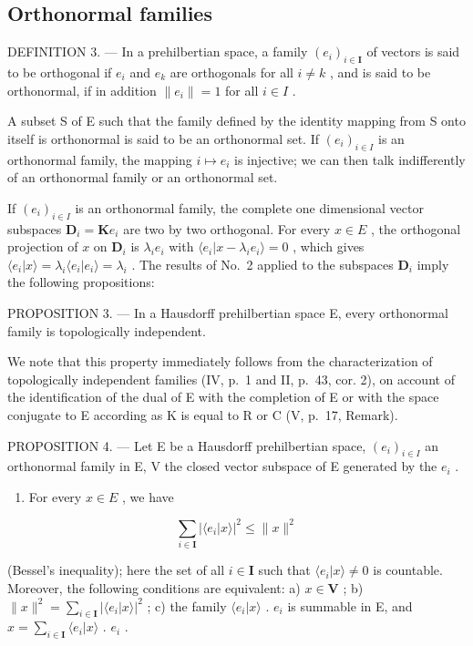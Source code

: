 \subsection{Orthonormal families}

DEFINITION 3. --- In a prehilbertian space, a family \((e_{i})_{i\in\mathbf{I}}\) of vectors is said to be orthogonal if \(e_{i}\) and \(e_{k}\) are orthogonals for all \(i\neq k\) , and is said to be orthonormal, if in addition \(\|e_{i}\|=1\) for all \(i\in I\) .

A subset S of E such that the family defined by the identity mapping from S onto itself is orthonormal is said to be an orthonormal set. If \((e_{i})_{i\in I}\) is an orthonormal family, the mapping \(i\mapsto e_{i}\) is injective; we can then talk indifferently of an orthonormal family or an orthonormal set.

If \((e_i)_{i\in I}\) is an orthonormal family, the complete one dimensional vector subspaces \(\mathbf{D}_i = \mathbf{K}e_i\) are two by two orthogonal. For every \(x\in E\) , the orthogonal projection of \(x\) on \(\mathbf{D}_i\) is \(\lambda_i e_i\) with \(\langle e_i|x - \lambda_i e_i\rangle = 0\) , which gives \(\langle e_i|x\rangle = \lambda_i\langle e_i|e_i\rangle = \lambda_i\) . The results of No.~2 applied to the subspaces \(\mathbf{D}_i\) imply the following propositions:

PROPOSITION 3. --- In a Hausdorff prehilbertian space E, every orthonormal family is topologically independent.

We note that this property immediately follows from the characterization of topologically independent families (IV, p.~1 and II, p.~43, cor. 2), on account of the identification of the dual of E with the completion of E or with the space conjugate to E according as K is equal to R or C (V, p.~17, Remark).

PROPOSITION 4. --- Let E be a Hausdorff prehilbertian space, \((e_{i})_{i\in I}\) an orthonormal family in E, V the closed vector subspace of E generated by the \(e_{i}\) .

\begin{enumerate}
\def\labelenumi{\arabic{enumi})}
\tightlist
\item
  For every \(x \in E\) , we have
\end{enumerate}

\[
\sum_ {i \in \mathbf {I}} \left| \langle e _ {i} | x \rangle \right| ^ {2} \leqslant \| x \| ^ {2}\tag{1}
\]

(Bessel's inequality); here the set of all \(i \in \mathbf{I}\) such that \(\langle e_i|x\rangle \neq 0\) is countable. Moreover, the following conditions are equivalent: a) \(x \in \mathbf{V}\) ; b) \(\|x\|^2 = \sum_{i \in \mathbf{I}} |\langle e_i|x\rangle|^2\) ; c) the family \(\langle e_i|x\rangle\) . \(e_i\) is summable in E, and \(x = \sum_{i \in \mathbf{I}} \langle e_i|x\rangle\) . \(e_i\) .

